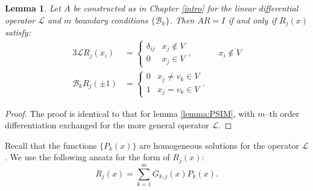 \documentclass{sfuthesis}
\newtheorem{lemma}{Lemma}
\begin{document}
\begin{lemma}
Let $A$ be constructed as in Chapter \ref{intro} for the linear differential operator $\mathcal{L}$ and $m$ boundary conditions $\{ \mathcal{B}_k \}$.
Then $AR = I$ if and only if $R_j(x)$ satisfy:
\begin{alignat}{3} \label{inverse conditions}
\mathcal{L} R_j(x_i) & = \begin{cases} \delta_{ij} & x_j \notin V \\ 0 & x_j \in V \end{cases}, && x_i \notin V \\
\mathcal{B}_k R_j(\pm 1) & = \begin{cases} 0 & x_j \neq v_k \in V \\ 1 & x_j = v_k \in V \end{cases} .
\end{alignat}
\end{lemma}

\begin{proof}
The proof is identical to that for lemma \ref{lemma:PSIM}, with $m$--th order differentiation exchanged for the more general operator $\mathcal{L}$.
\end{proof}


Recall that the functions $\{ P_k(x) \}$ are homogeneous solutions for the operator $\mathcal{L}$.
We use the following ansatz for the form of $R_j(x)$:
\begin{equation} \label{ansatz}
R_j(x) = \sum_{k=1}^m G_{k,j}(x) P_k(x) .
\end{equation}
\end{document}
